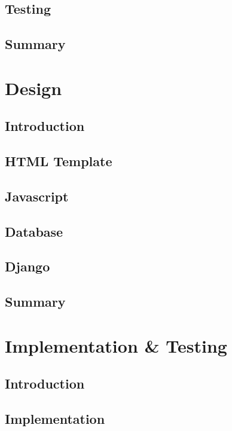 \documentclass[a4paper,12pt,oneside]{book}
\begin{document}
	\section{Testing}
		
	\section{Summary}
		
		
\chapter{Design}
\label{ch:design} 
	\section{Introduction}
		
	\section{HTML Template}
		
	\section{Javascript}
		
	\section{Database}
		
	\section{Django}
		
	\section{Summary}
		
		
\chapter{Implementation \& Testing}
	\section{Introduction}
		
	\section{Implementation}
		
		\label{ch:implementation} 
\end{document}
